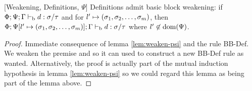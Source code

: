 \documentclass[a4paper, oneside, 10pt, draft]{memoir}
\begin{document}
\begin{lem}{[Weakening, Definitions, $\Psi$]}
  \label{lem:weaken-psi-d}
  Definitions admit basic block weakening: if $\Phi;\Psi;\Gamma |-_{\mathrm{b}} d
  : \sigma / \tau$ and for $l' \mapsto (\sigma_1, \sigma_2, \dotsc, \sigma_m)$, then
  $\Phi;\Psi[l' \mapsto (\sigma_1, \sigma_2, \dotsc, \sigma_m)];\Gamma |-_{\mathrm{b}} d : \sigma / \tau$ where
  $l' \not \in \mathrm{dom}(\Psi)$.
\end{lem}
\begin{proof}
  Immediate consequence of lemma \ref{lem:weaken-psi} and the rule
  BB-Def. We weaken the premise and so it can used to construct a
  new BB-Def rule as wanted. Alternatively, the proof is actually part
  of the mutual induction hypothesis in lemma \ref{lem:weaken-psi} so we
  could regard this lemma as being part of the lemma above.
\end{proof}
\end{document}
